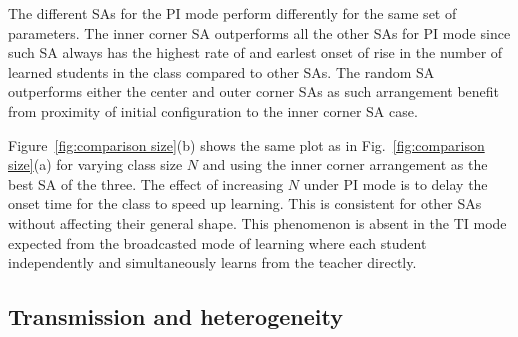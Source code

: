 \documentclass[twocolumn,secnumarabic,amssymb, nobibnotes, aps, prd]{revtex4-2}
\begin{document}
        The different SAs for the PI mode perform differently for the same set of parameters.
        The inner corner SA outperforms all the other SAs for PI mode since such SA always has the highest rate of and earlest onset of rise in the number of learned students in the class compared to other SAs.
        The random SA outperforms either the center and outer corner SAs as such arrangement benefit from proximity of initial configuration to the inner corner SA case.

        Figure~\ref{fig:comparison size}(b) shows the same plot as in Fig.~\ref{fig:comparison size}(a) for varying class size $N$ and using the inner corner arrangement as the best SA of the three.
        The effect of increasing $N$ under PI mode is to delay the onset time for the class to speed up learning.
        This is consistent for other SAs without affecting their general shape. 
        This phenomenon is absent in the TI mode expected from the broadcasted mode of learning where each student independently and simultaneously learns from the teacher directly.

    \subsection{Transmission and heterogeneity}
\end{document}
